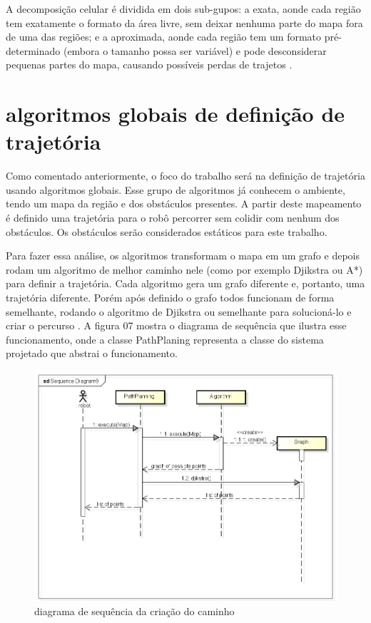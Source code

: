 A decomposição celular é dividida em dois sub-gupos: a exata, aonde cada região tem exatamente o formato da área livre, sem deixar nenhuma parte do mapa fora de uma das regiões; e a aproximada, aonde cada região tem um formato pré-determinado (embora o tamanho possa ser variável) e pode desconsiderar pequenas partes do mapa, causando possíveis perdas de trajetos \cite{Souza2008}.

\section{algoritmos globais de definição de trajetória}

Como comentado anteriormente, o foco do trabalho será na definição de trajetória usando algoritmos globais. Esse grupo de algoritmos já conhecem o ambiente, tendo um mapa da região e dos obstáculos presentes. A partir deste mapeamento é definido uma trajetória para o robô percorrer sem colidir com nenhum dos obstáculos. Os obstáculos serão considerados estáticos para este trabalho.

Para fazer essa análise, os algoritmos transformam o mapa em um grafo e depois rodam um algoritmo de melhor caminho nele (como por exemplo Djikstra ou A*) para definir a trajetória. Cada algoritmo gera um grafo diferente e, portanto, uma trajetória diferente. Porém após definido o grafo todos funcionam de forma semelhante, rodando o algoritmo de Djikstra ou semelhante para solucioná-lo e criar o percurso \cite{Guzman2008}. A figura 07 mostra o diagrama de sequência que ilustra esse funcionamento, onde a classe PathPlaning representa a classe do sistema projetado que abstrai o funcionamento.

\begin{figure}[h]
	\centering
	\label{fig07}
		\includegraphics[keepaspectratio=true,scale=0.6]{figuras/5diagramaSequencia.png}
	\caption{diagrama de sequência da criação do caminho}
\end{figure}

